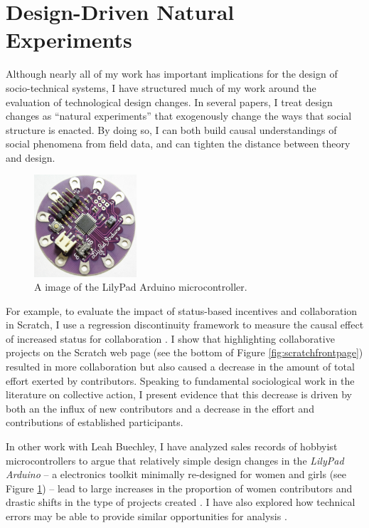 \documentclass[10pt]{memoir}
\begin{document}
\section{Design-Driven Natural Experiments}

Although nearly all of my work has important implications for the
design of socio-technical systems, I have structured much of my work
around the evaluation of technological design changes. In several
papers, I treat design changes as ``natural experiments'' that
exogenously change the ways that social structure is enacted. By doing
so, I can both build causal understandings of social phenomena from
field data, and can tighten the distance between theory and design.

\begin{figure}
 \vspace{-1em}
 \begin{centering}
 \includegraphics[width=1.5in]{figures/lilypad.png}
 \caption{A image of the LilyPad Arduino microcontroller.}
 \label{fig:lilypad}
 \end{centering}
 \vspace{-1em}
\end{figure}

For example, to evaluate the impact of status-based incentives and
collaboration in Scratch, I use a regression discontinuity framework
to measure the causal effect of increased status for collaboration
\cite{hill_causal_2012}. I show that highlighting collaborative
projects on the Scratch web page (see the bottom of Figure
\ref{fig:scratchfrontpage}) resulted in more collaboration but also
caused a decrease in the amount of total effort exerted by
contributors. Speaking to fundamental sociological work in the
literature on collective action, I present evidence that this decrease
is driven by both an the influx of new contributors and a decrease in
the effort and contributions of established participants.

In other work with Leah Buechley, I have analyzed sales records of
hobbyist microcontrollers to argue that relatively simple design
changes in the \emph{LilyPad Arduino} -- a electronics toolkit
minimally re-designed for women and girls (see Figure
\ref{fig:lilypad}) -- lead to large increases in the proportion of
women contributors and drastic shifts in the type of projects created
\cite{buechley_lilypad_2010}. I have also explored how technical
errors may be able to provide similar opportunities for analysis
\cite{hill_revealing_2010}.
\end{document}
